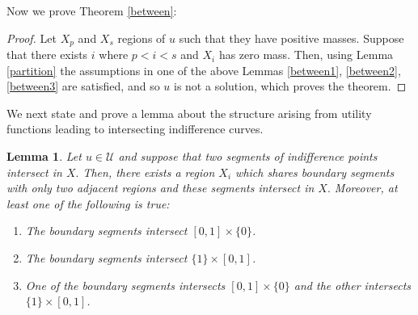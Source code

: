 \documentclass[12pt,reqno]{amsart}
\newtheorem{lem}{Lemma}
\begin{document}
Now we prove Theorem \ref{between}:
\begin{proof}
    Let $X_p$ and $X_s$ regions of $u$ such that they have positive masses. Suppose that  there exists $i$ where $p<i<s$ and $X_i$ has zero mass. Then, using Lemma \ref{partition} the assumptions in one of the above Lemmas \ref{between1}, \ref{between2}, \ref{between3} are satisfied, and so $u$ is not a solution, which proves the theorem. 
\end{proof}
We next state and prove a lemma about the structure arising from utility functions leading to intersecting indifference curves.
\begin{lem}\label{triangle}
   Let $u\in \mathcal{U}$ and suppose that two segments of indifference points intersect in $X.$ Then, there exists a region $X_i$ which shares boundary segments with only two adjacent regions and these segments intersect in $X.$ Moreover, at least one of the following is true:
   \begin{enumerate}
       \item The boundary segments intersect $[0,1]\times\{0\}$.
       \item  The boundary segments intersect $\{1\}\times[0,1]$. 
\item One of the boundary segments intersects $[0,1]\times\{0\}$ and the other intersects $\{1\}\times[0,1]$.

   \end{enumerate}
\end{lem}
\end{document}
